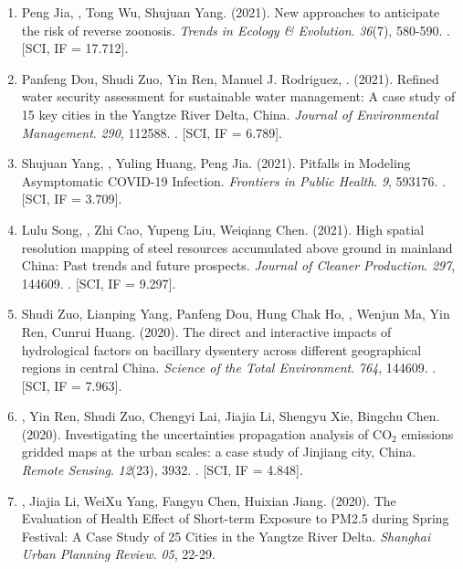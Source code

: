 \begin{enumerate}
\item
    Peng Jia, \Shaoqing, Tong Wu, Shujuan Yang. (2021).
    New approaches to anticipate the risk of reverse zoonosis.
    \textit{Trends in Ecology \& Evolution}. \textit{36}(7), 580-590.
    . [SCI, IF = 17.712].
\item
    Panfeng Dou, Shudi Zuo, Yin Ren, Manuel J. Rodriguez, \Shaoqing. (2021).
    Refined water security assessment for sustainable water management: A case study of 15 key cities in the Yangtze River Delta, China.
    \textit{Journal of Environmental Management}. \textit{290}, 112588.
    . [SCI, IF = 6.789].
\item
    Shujuan Yang, \Shaoqing, Yuling Huang, Peng Jia. (2021).
    Pitfalls in Modeling Asymptomatic COVID-19 Infection.
    \textit{Frontiers in Public Health}. \textit{9}, 593176.
    . [SCI, IF = 3.709].
\item
    Lulu Song, \Shaoqing, Zhi Cao, Yupeng Liu, Weiqiang Chen. (2021).
    High spatial resolution mapping of steel resources accumulated above ground in mainland China: Past trends and future prospects.
    \textit{Journal of Cleaner Production}. \textit{297}, 144609.
    . [SCI, IF = 9.297].
\item
    Shudi Zuo, Lianping Yang, Panfeng Dou, Hung Chak Ho, \Shaoqing, Wenjun Ma, Yin Ren, Cunrui Huang. (2020).
    The direct and interactive impacts of hydrological factors on bacillary dysentery across different geographical regions in central China.
    \textit{Science of the Total Environment}. \textit{764}, 144609.
    . [SCI, IF = 7.963].
\item
    \Shaoqing\CF, Yin Ren\CF, Shudi Zuo, Chengyi Lai, Jiajia Li, Shengyu Xie, Bingchu Chen. (2020).
    Investigating the uncertainties propagation analysis of CO$_2$ emissions gridded maps at the urban scales: a case study of Jinjiang city, China. 
    \textit{Remote Sensing}. \textit{12}(23), 3932.
    . [SCI, IF = 4.848].
\item
    \Shaoqing, Jiajia Li, WeiXu Yang, Fangyu Chen, Huixian Jiang. (2020).
    The Evaluation of Health Effect of Short-term Exposure to PM2.5 during Spring Festival: A Case Study of 25 Cities in the Yangtze River Delta.
    \textit{Shanghai Urban Planning Review}. \textit{05}, 22-29.

\end{enumerate}
